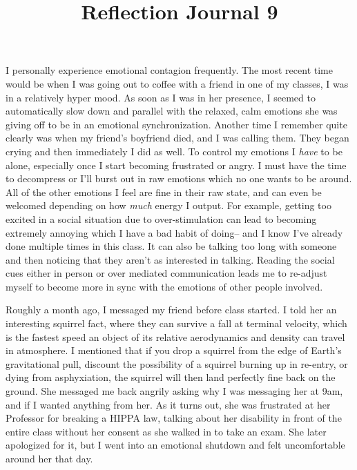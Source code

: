 \documentclass[12pt]{article}
\begin{document}
\title{Reflection Journal 9}
I personally experience emotional contagion frequently. The most recent time would be when I was going out to coffee with a friend in one of my classes, I was in a relatively hyper mood. As soon as I was in her presence, I seemed to automatically slow down and parallel with the relaxed, calm emotions she was giving off to be in an emotional synchronization. Another time I remember quite clearly was when my friend's boyfriend died, and I was calling them. They began crying and then immediately I did as well.
To control my emotions I \emph{have} to be alone, especially once I start becoming frustrated or angry. I must have the time to decompress or I'll burst out in raw emotions which no one wants to be around. All of the other emotions I feel are fine in their raw state, and can even be welcomed depending on how \emph{much} energy I output. For example, getting too excited in a social situation due to over-stimulation can lead to becoming extremely annoying which I have a bad habit of doing-- and I know I've already done multiple times in this class. It can also be talking too long with someone and then noticing that they aren't as interested in talking. Reading the social cues either in person or over mediated communication leads me to re-adjust myself to become more in sync with the emotions of other people involved.

Roughly a month ago, I messaged my friend before class started. I told her an interesting squirrel fact, where they can survive a fall at terminal velocity, which is the fastest speed an object of its relative aerodynamics and density can travel in atmosphere. I mentioned that if you drop a squirrel from the edge of Earth's gravitational pull, discount the possibility of a squirrel burning up in re-entry, or dying from asphyxiation, the squirrel will then land perfectly fine back on the ground. She messaged me back angrily asking why I was messaging her at 9am, and if I wanted anything from her. As it turns out, she was frustrated at her Professor for breaking a HIPPA law, talking about her disability in front of the entire class without her consent as she walked in to take an exam. She later apologized for it, but I went into an emotional shutdown and felt uncomfortable around her that day.
\end{document}
